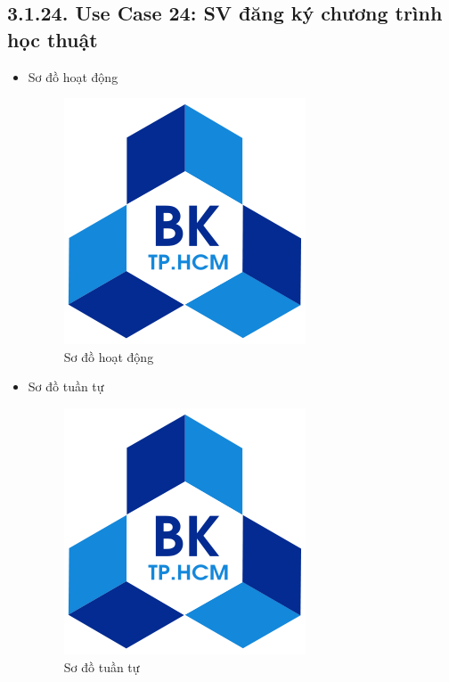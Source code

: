 \subsection*{3.1.24. Use Case 24: SV đăng ký chương trình học thuật}
\begin{itemize}
    \item Sơ đồ hoạt động
    \begin{figure}[H]
    \centering
    \includegraphics[scale=0.5 ]{Picture/hcmut.png}
    \caption{Sơ đồ hoạt động }
    \end{figure}
    \item Sơ đồ tuần tự
    \begin{figure}[H]
    \centering
    \includegraphics[scale=0.5 ]{Picture/hcmut.png}
    \caption{Sơ đồ tuần tự }
    \end{figure}
\end{itemize}
